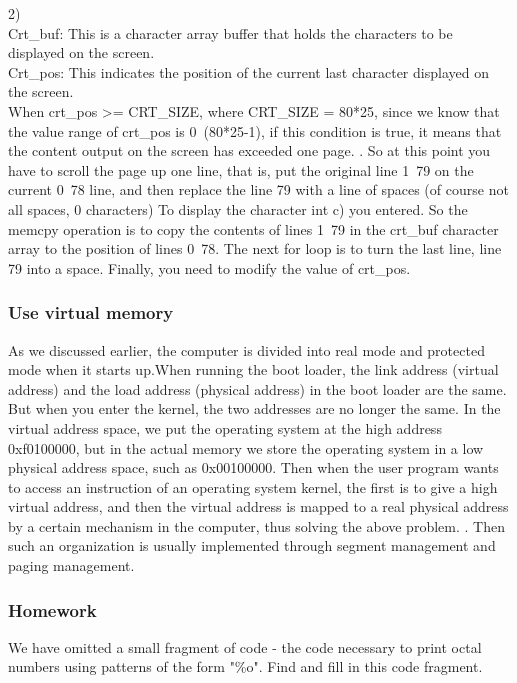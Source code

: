 \begin{flushleft}
2)\\
\qquad Crt\_buf: This is a character array buffer that holds the characters to be displayed on the screen.\\

\qquad Crt\_pos: This indicates the position of the current last character displayed on the screen.\\
\qquad When crt\_pos >= CRT\_SIZE, where CRT\_SIZE = 80*25, since we know that the value range of crt\_pos is 0~(80*25-1), if this condition is true, it means that the content output on the screen has exceeded one page. . So at this point you have to scroll the page up one line, that is, put the original line 1~79 on the current 0~78 line, and then replace the line 79 with a line of spaces (of course not all spaces, 0 characters) To display the character int c) you entered. So the memcpy operation is to copy the contents of lines 1~79 in the crt\_buf character array to the position of lines 0~78. The next for loop is to turn the last line, line 79 into a space. Finally, you need to modify the value of crt\_pos.
\end{flushleft}

\subsubsection{Use virtual memory}
As we discussed earlier, the computer is divided into real mode and protected mode when it starts up.When running the boot loader, the link address (virtual address) and the load address (physical address) in the boot loader are the same. But when you enter the kernel, the two addresses are no longer the same.
In the virtual address space, we put the operating system at the high address 0xf0100000, but in the actual memory we store the operating system in a low physical address space, such as 0x00100000. Then when the user program wants to access an instruction of an operating system kernel, the first is to give a high virtual address, and then the virtual address is mapped to a real physical address by a certain mechanism in the computer, thus solving the above problem. . Then such an organization is usually implemented through segment management and paging management.
\subsubsection{Homework }
{\Large We have omitted a small fragment of code - the code necessary to print octal numbers using patterns of the form "\%o". Find and fill in this code fragment.}

